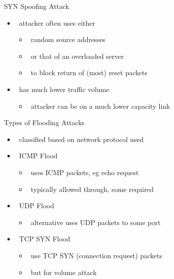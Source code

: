 \documentclass{beamer}
\begin{document}
\begin{frame}{SYN Spoofing Attack }
  \begin{itemize}
  \item  attacker often uses either 
    \begin{itemize}
    \item  random source addresses 
    \item  or that of an overloaded server 
    \item  to block return of (most) reset packets 
    \end{itemize}
  \item  has much lower traffic volume 
    \begin{itemize}
    \item  attacker can be on a much lower capacity link 
    \end{itemize}
  \end{itemize}
\end{frame}


\begin{frame}{Types of Flooding Attacks }
  \begin{itemize}
  \item  classified based on network protocol used 
  \item  ICMP Flood 
    \begin{itemize}
    \item  uses ICMP packets, eg echo request 
    \item  typically allowed through, some required 
    \end{itemize}
  \item  UDP Flood 
    \begin{itemize}
    \item  alternative uses UDP packets to some port 
    \end{itemize}
  \item  TCP SYN Flood 
    \begin{itemize}
    \item  use TCP SYN (connection request) packets 
    \item  but for volume attack 
    \end{itemize}
  \end{itemize}
\end{frame}
\end{document}
